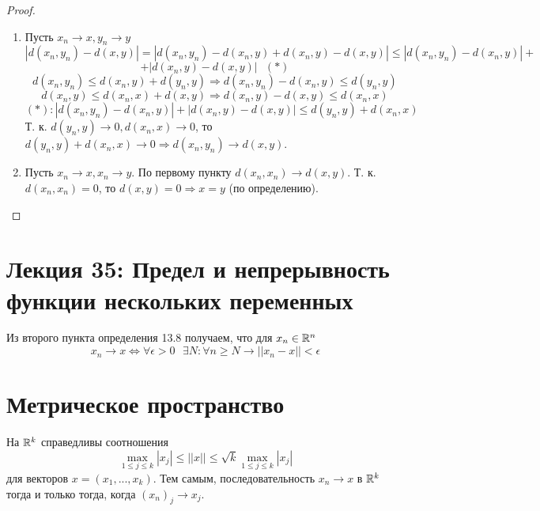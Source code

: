     \begin{proof}
    	\begin{enumerate}
    		\item Пусть $x_n \to x, y_n \to y$
    		\[ |d(x_n, y_n) - d(x, y)| = |d(x_n, y_n) - d(x_n, y) + d(x_n, y) - d(x, y)| \leqslant |d(x_n, y_n) - d(x_n, y)| + \]
    		\[ + |d(x_n, y) - d(x, y)| \text{ } (*) \]
    		\[ d(x_n, y_n) \leqslant d(x_n, y) + d(y_n, y) \Rightarrow d(x_n, y_n) - d(x_n, y) \leqslant d(y_n, y) \]
    		\[ d(x_n, y) \leqslant d(x_n, x) + d(x, y) \Rightarrow d(x_n, y) - d(x, y) \leqslant d(x_n, x) \]
    		\[ (*): |d(x_n, y_n) - d(x_n, y)| + |d(x_n, y) - d(x, y)| \leqslant d(y_n, y) + d(x_n, x) \]
    		Т. к. $d(y_n, y) \to 0, d(x_n, x) \to 0$, то $d(y_n, y) + d(x_n, x) \to 0 \Rightarrow d(x_n, y_n) \to d(x, y)$.
    		\item Пусть $x_n \to x, x_n \to y$. По первому пункту $d(x_n, x_n) \to d(x, y)$. Т. к. $d(x_n, x_n) = 0$, то $d(x, y) = 0 \Rightarrow x = y$ (по определению).
    	\end{enumerate}
    \end{proof}
    
    \newpage
    
    \section*{Лекция 35: Предел и непрерывность функции нескольких переменных}
    
    Из второго пункта определения 13.8 получаем, что для $x_n \in \mathbb R^n$
    \[ x_n \to x \Leftrightarrow \forall \epsilon > 0 \text{ } \exists N: \forall n \geqslant N \rightarrow ||x_n - x|| < \epsilon \] 
    
    \section{Метрическое пространство}
    
    \begin{mention}
    	На $\mathbb R^k$ справедливы соотношения
    	\[ \max_{1 \leqslant j \leqslant k} |x_j| \leqslant ||x|| \leqslant \sqrt{k} \max_{1 \leqslant j \leqslant k} |x_j| \]
    	для векторов $x = (x_1, ..., x_k)$. Тем самым, последовательность $x_n \rightarrow x$ в $\mathbb R^k$ тогда и только тогда, когда $(x_n)_j \rightarrow x_j$.
    \end{mention}
    
